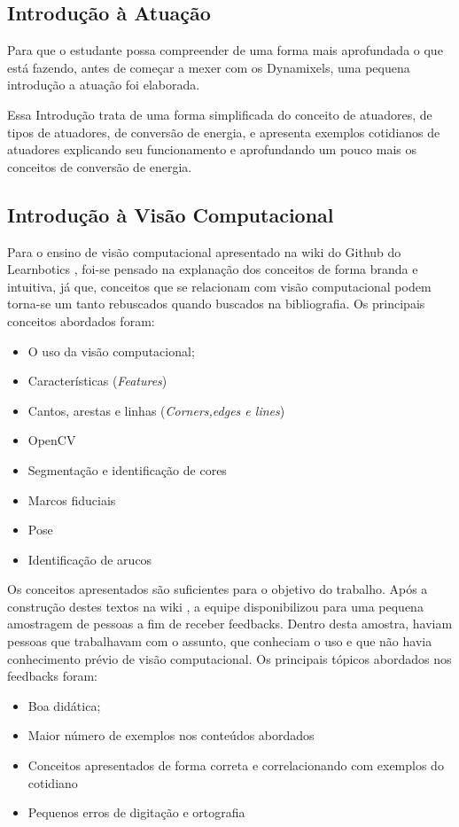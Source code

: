 \subsection{Introdução à Atuação}
Para que o estudante possa compreender de uma forma mais aprofundada o que está fazendo, antes de começar a mexer com os Dynamixels, uma pequena introdução a atuação foi elaborada.

Essa Introdução trata de uma forma simplificada do conceito de atuadores, de tipos de atuadores, de conversão de energia, e apresenta exemplos cotidianos de atuadores explicando seu funcionamento e aprofundando um pouco mais os conceitos de conversão de energia. \cite{tutAtua}

\subsection{Introdução à Visão Computacional}
Para o ensino de visão computacional apresentado na wiki do Github do Learnbotics \cite{wikilearn}, foi-se pensado na explanação dos conceitos de forma branda e intuitiva, já que, conceitos que se relacionam com visão computacional podem torna-se um tanto rebuscados quando buscados na bibliografia. Os principais conceitos abordados foram:
\begin{itemize}
	\item O uso da visão computacional;
	\item Características  (\textit{Features})
	\item Cantos, arestas e linhas (\textit{Corners,edges e lines})
	\item OpenCV
	\item Segmentação e identificação de cores
	\item Marcos fiduciais
	\item Pose
	\item Identificação de arucos
	
\end{itemize}

Os conceitos apresentados são suficientes para o objetivo do trabalho. Após a construção destes textos na wiki \cite{tutVis}, a equipe disponibilizou para uma pequena amostragem de pessoas a fim de receber feedbacks. Dentro desta amostra, haviam pessoas que trabalhavam com o assunto, que conheciam o uso e que não havia conhecimento prévio de visão computacional. Os principais tópicos abordados nos feedbacks foram:

\begin{itemize}
	\item Boa didática;
	\item Maior número de exemplos nos conteúdos abordados
	\item Conceitos apresentados de forma correta e correlacionando com exemplos do cotidiano
	\item Pequenos erros de digitação e ortografia
\end{itemize}

